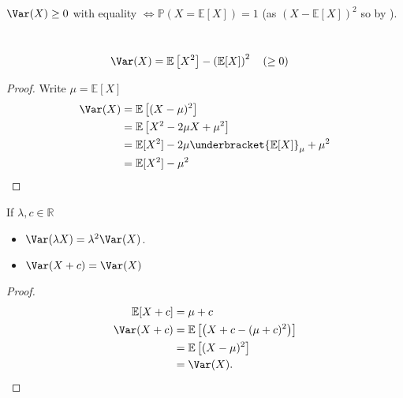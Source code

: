 \begin{proposition}
    $\Var(X) \geq 0$ with equality $\iff \mathbb{P}(X = \mathbb{E}[X]) = 1$ (as $(X - \mathbb{E}[X])^2$ so by ).
\end{proposition} 

\begin{definition} ~\vspace*{-1.5\baselineskip}
    \begin{align*}
        \Var(X) &= \mathbb{E}\left[X^2\right] - \left( \mathbb{E}[X] \right)^2 \quad (\geq 0)
    \end{align*} 
\end{definition} 

\begin{proof}
    Write $\mu = \mathbb{E}[X]$
    \begin{align*}
        \Var(X) &= \mathbb{E}\left[ (X - \mu)^2 \right] \\
        &= \mathbb{E}\left[X^2 - 2\mu X + \mu^2\right] \\
        &= \mathbb{E}[X^2] - 2 \mu \underbracket{\mathbb{E}[X]}_\mu + \mu^2 \\
        &= \mathbb{E}[X^2] - \mu^2
    \end{align*} 
\end{proof} 

\begin{proposition}[Properties]
    If $\lambda, c \in \mathbb{R}$
    \begin{itemize}
        \item $\Var(\lambda X) = \lambda^2 \Var(X)$.
        \item $\Var(X + c) = \Var(X)$
    \end{itemize} 
\end{proposition} 

\begin{proof}
    \begin{align*}
        \mathbb{E}[X + c] &= \mu + c \\
        \Var(X + c) &= \mathbb{E}\left[\left( X + c - (\mu + c)^2 \right)\right] \\
        &= \mathbb{E}\left[(X - \mu)^2\right] \\
        &= \Var(X).
    \end{align*} 
\end{proof} 

